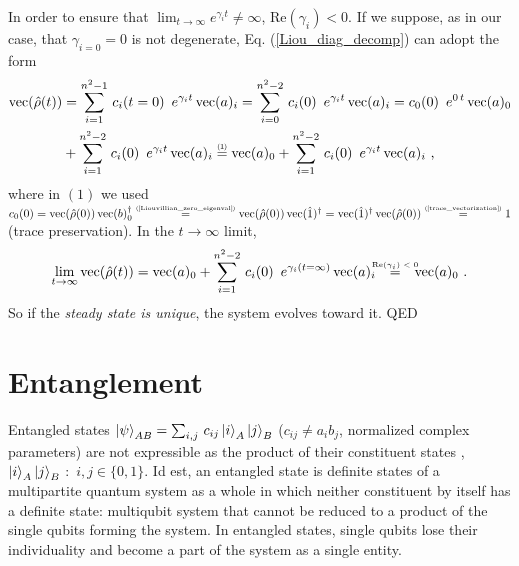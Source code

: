 \documentclass[11pt]{article}
\numberwithin{equation}{section} %
\numberwithin{figure}{section} %
\newcommand\numeq[1] %
  {\stackrel{\scriptscriptstyle(\mkern-1.5mu#1\mkern-1.5mu)}{=}}
\begin{document}
\begin{appendices}
In order to ensure that $\lim_{t\to\infty}e^{\gamma_it}\neq \infty$, $\textrm{Re}(\gamma_i)<0$. If we suppose, as in our case, that $\gamma_{i=0}=0$ is not degenerate, Eq. (\ref{Liou_diag_decomp}) can adopt the form 
\begin{equation}
\begin{split}
\textrm{vec}(\hat{\rho}(t)) 
&= \sum_{i=1}^{n^2-1}\, c_i(t=0)\,\,\,e^{\gamma_it}\,\textrm{vec}(a)_i = \sum_{i=0}^{n^2-2}\, c_i(0)\,\,\,e^{\gamma_it}\,\textrm{vec}(a)_i = c_0(0)\,\,\,e^{0\,t}\,\textrm{vec}(a)_0 \\
& + \sum_{i=1}^{n^2-2}\, c_i(0)\,\,\,e^{\gamma_it}\,\textrm{vec}(a)_i \numeq{1} \textrm{vec}(a)_0 + \sum_{i=1}^{n^2-2}\, c_i(0)\,\,\,e^{\gamma_it}\,\textrm{vec}(a)_i\,\,\textrm{,}
\end{split}
\end{equation}
where in $(1)$ we used $c_0(0)=\textrm{vec}(\hat{\rho}(0))\,\textrm{vec}(b)^\dagger_0 \numeq{\textrm{\ref{Liouvillian_zero_eigenval}}} \textrm{vec}(\hat{\rho}(0))\,\textrm{vec}(\hat{1})^\dagger = \textrm{vec}(\hat{1})^\dagger\,\textrm{vec}(\hat{\rho}(0)) \numeq{\textrm{\ref{trace_vectorization}}} 1$ (trace preservation). In the $t\to \infty$ limit,
\begin{equation}
\begin{split}
\lim_{t\to\infty}\textrm{vec}(\hat{\rho}(t)) 
= \textrm{vec}(a)_0 + \sum_{i=1}^{n^2-2}\, c_i(0)\,\,\,e^{\gamma_i(t=\infty)}\,\textrm{vec}(a)_i \,\,\,\,\,\,\newcommand\myeq1{\mathrel{\stackrel{\makebox[0pt]{\mbox{\normalfont\tiny $\textrm{Re}(\gamma_i)<0$}}}{=}}}\,\,\,\,\,\,\textrm{vec}(a)_0\,\,\textrm{.}
\end{split}
\end{equation}
So if the \emph{steady state is unique}, the system evolves toward it. QED












\section{Entanglement} \label{Entanglement}
Entangled states $\ket{\psi}_{AB}=\sum_{i,j}\,c_{ij}\ket{i}_A\ket{j}_B$ ($c_{ij}\neq a_i b_j$, normalized complex parameters) are not expressible as the product of their constituent states , $\ket{i}_A\ket{j}_B$ $:$ $i,j\in\{0,1\}$. Id est, an entangled state is definite states of a multipartite quantum system as a whole in which neither constituent by itself has a definite state: multiqubit  system that  cannot  be  reduced  to a product of the single qubits forming the system. In entangled states, single qubits lose their individuality and become a part of the system as a single entity.


\end{appendices}
\end{document}
